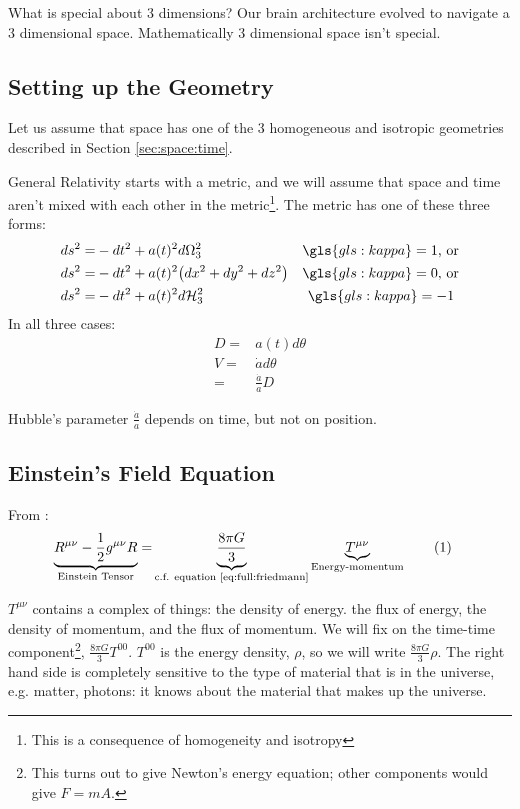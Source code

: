\documentclass[]{article}
\newcommand\numberthis{\addtocounter{equation}{1}\tag{\theequation}}
\begin{document}
What is special about 3 dimensions? Our brain architecture evolved to navigate a 3 dimensional space. Mathematically 3 dimensional space isn't special.

\subsection{Setting up the Geometry}


Let us assume that space has one of the 3 homogeneous and isotropic geometries described in Section \ref{sec:space:time}.

General Relativity starts with a metric, and we will assume that space and time aren't mixed with each other in the metric\footnote{This is a consequence of homogeneity and isotropy}. The metric has one of these three forms:
\begin{align*}
	ds^2 =& - dt^2 + a(t)^2 d\Omega_3^2 &\gls{gls:kappa}=1\text{, or}\\
	ds^2 =& - dt^2 + a(t)^2 \big(dx^2 + dy^2 +dz^2\big) &\gls{gls:kappa}=0\text{, or}\\
	ds^2 =& - dt^2 + a(t)^2 d\mathcal{H}_3^2 &\gls{gls:kappa}=-1	\text{ }
\end{align*}
In all three cases:
\begin{align*}
	D =& a(t) d\theta\\
	V =&  \dot{a} d\theta\\
	=& \frac{\dot{a}}{a}D	
\end{align*}

Hubble's parameter $\frac{\dot{a}}{a}$ depends on time, but not on position.

\subsection{Einstein's Field Equation}

From \cite[Lecture 9]{susskind2012general}:
\begin{align*}
	\underbrace{R^{\mu\nu} - \frac{1}{2}g^{\mu\nu}R}_\text{Einstein Tensor}=&\underbrace{\frac{8\pi G}{3}}_\text{c.f. equation \eqref{eq:full:friedmann}}\underbrace{ T^{\mu\nu}}_\text{Energy-momentum} \numberthis \label{eq:einstein:field}
\end{align*}

$T^{\mu\nu}$ contains a complex of things: the density of energy. the flux of energy, the density of momentum, and the flux of momentum. We will fix on the time-time component\footnote{This turns out to give Newton's energy equation; other components would give $F=mA$.}, $\frac{8\pi G}{3} T^{00}$. $T^{00}$ is the energy density, $\rho$, so we will write $\frac{8\pi G}{3} \rho$. The right hand side is completely sensitive to the type of material that is in the universe, e.g. matter, photons: it knows about the material that makes up the universe.
\end{document}

